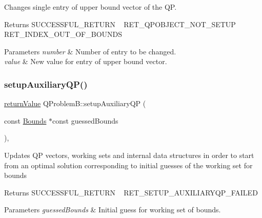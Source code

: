 Changes single entry of upper bound vector of the QP. \begin{DoxyReturn}{Returns}
S\+U\+C\+C\+E\+S\+S\+F\+U\+L\+\_\+\+R\+E\+T\+U\+RN ~\newline
 R\+E\+T\+\_\+\+Q\+P\+O\+B\+J\+E\+C\+T\+\_\+\+N\+O\+T\+\_\+\+S\+E\+T\+UP ~\newline
 R\+E\+T\+\_\+\+I\+N\+D\+E\+X\+\_\+\+O\+U\+T\+\_\+\+O\+F\+\_\+\+B\+O\+U\+N\+DS 
\end{DoxyReturn}

\begin{DoxyParams}{Parameters}
{\em number} & Number of entry to be changed. \\
\hline
{\em value} & New value for entry of upper bound vector. \\
\hline
\end{DoxyParams}
\mbox{\label{class_q_problem_b_aa241e899e7019423ee5bba4edc1f4d23}} 
\subsubsection{\texorpdfstring{setup\+Auxiliary\+Q\+P()}{setupAuxiliaryQP()}}
{\footnotesize\ttfamily \hyperlink{_message_handling_8hpp_a81d556f613bfbabd0b1f9488c0fa865e}{return\+Value} Q\+Problem\+B\+::setup\+Auxiliary\+QP (\begin{DoxyParamCaption}\item[{const \hyperlink{class_bounds}{Bounds} $\ast$const}]{guessed\+Bounds }\end{DoxyParamCaption})\hspace{0.3cm}{\ttfamily [protected]}, {\ttfamily [virtual]}}

Updates QP vectors, working sets and internal data structures in order to start from an optimal solution corresponding to initial guesses of the working set for bounds \begin{DoxyReturn}{Returns}
S\+U\+C\+C\+E\+S\+S\+F\+U\+L\+\_\+\+R\+E\+T\+U\+RN ~\newline
 R\+E\+T\+\_\+\+S\+E\+T\+U\+P\+\_\+\+A\+U\+X\+I\+L\+I\+A\+R\+Y\+Q\+P\+\_\+\+F\+A\+I\+L\+ED 
\end{DoxyReturn}

\begin{DoxyParams}{Parameters}
{\em guessed\+Bounds} & Initial guess for working set of bounds. \\
\hline
\end{DoxyParams}
\mbox{\label{class_q_problem_b_afe7b38887f4823cecc668b99299d145b}} 
